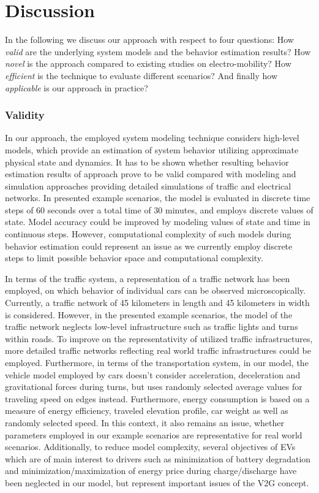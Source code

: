 \section{Discussion}
\label{section:discussion}

In the following we discuss our approach with respect to four questions: How \textit{valid} are the underlying system models and the behavior estimation results? How \textit{novel} is the approach compared to existing studies on electro-mobility? How \textit{efficient} is the technique to evaluate different scenarios? And finally how \textit{applicable} is our approach in practice?

\subsubsection*{Validity}

In our approach, the employed system modeling technique considers high-level models, which provide an estimation of system behavior utilizing approximate physical state and dynamics. It has to be shown whether resulting behavior estimation results of approach prove to be valid compared with modeling and simulation approaches providing detailed simulations of traffic and electrical networks. In presented example scenarios, the model is evaluated in discrete time steps of 60 seconds over a total time of 30 minutes, and employs discrete values of state. Model accuracy could be improved by modeling values of state and time in continuous steps. However, computational complexity of such models during behavior estimation could represent an issue as we currently employ discrete steps to limit possible behavior space and computational complexity.

In terms of the traffic system, a representation of a traffic network has been employed, on which behavior of individual cars can be observed microscopically. Currently, a traffic network of 45 kilometers in length and 45 kilometers in width is considered. However, in the presented example scenarios, the model of the traffic network neglects low-level infrastructure such as traffic lights and turns within roads. To improve on the representativity of utilized traffic infrastructures, more detailed traffic networks reflecting real world traffic infrastructures could be employed. Furthermore, in terms of the transportation system, in our model, the vehicle model employed by cars doesn't consider acceleration, deceleration and gravitational forces during turns, but uses randomly selected average values for traveling speed on edges instead. Furthermore, energy consumption is based on a measure of energy efficiency, traveled elevation profile, car weight as well as randomly selected speed. In this context, it also remains an issue, whether parameters employed in our example scenarios are representative for real world scenarios. Additionally, to reduce model complexity, several objectives of EVs which are of main interest to drivers such as minimization of battery degradation and minimization/maximization of energy price during charge/discharge have been neglected in our model, but represent important issues of the V2G concept.

